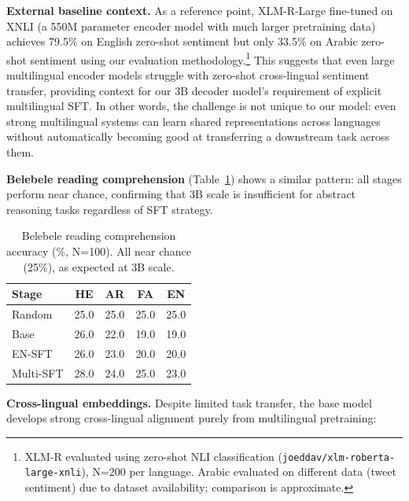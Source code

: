 \documentclass[10pt,twocolumn]{article}
\begin{document}
\textbf{External baseline context.} As a reference point, XLM-R-Large \citep{conneau2020unsupervised} fine-tuned on XNLI (a 550M parameter encoder model with much larger pretraining data) achieves 79.5\% on English zero-shot sentiment but only 33.5\% on Arabic zero-shot sentiment using our evaluation methodology.\footnote{XLM-R evaluated using zero-shot NLI classification (\texttt{joeddav/xlm-roberta-large-xnli}), N=200 per language. Arabic evaluated on different data (tweet sentiment) due to dataset availability; comparison is approximate.} This suggests that even large multilingual encoder models struggle with zero-shot cross-lingual sentiment transfer, providing context for our 3B decoder model's requirement of explicit multilingual SFT. In other words, the challenge is not unique to our model: even strong multilingual systems can learn shared representations across languages without automatically becoming good at transferring a downstream task across them.

\textbf{Belebele reading comprehension} (Table~\ref{tab:belebele}) shows a similar pattern: all stages perform near chance, confirming that 3B scale is insufficient for abstract reasoning tasks regardless of SFT strategy.

\begin{table}[H]
\centering\small
\begin{tabular}{lcccc}
\toprule
\textbf{Stage} & \textbf{HE} & \textbf{AR} & \textbf{FA} & \textbf{EN} \\
\midrule
Random & 25.0 & 25.0 & 25.0 & 25.0 \\
Base & 26.0 & 22.0 & 19.0 & 19.0 \\
EN-SFT & 26.0 & 23.0 & 20.0 & 20.0 \\
Multi-SFT & 28.0 & 24.0 & 25.0 & 23.0 \\
\bottomrule
\end{tabular}
\caption{Belebele reading comprehension accuracy (\%, N=100). All near chance (25\%), as expected at 3B scale.}
\label{tab:belebele}
\end{table}

\textbf{Cross-lingual embeddings.} Despite limited task transfer, the base model develops strong cross-lingual alignment purely from multilingual pretraining:
\end{document}
